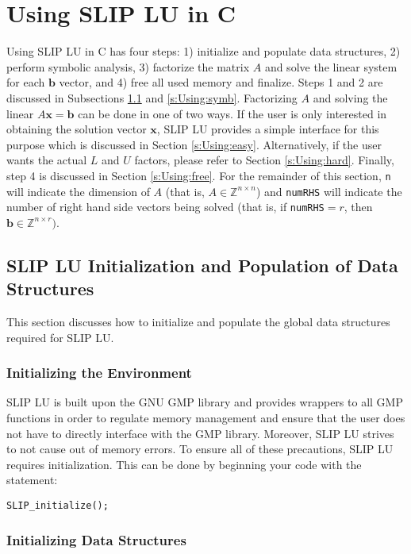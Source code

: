 \documentclass[11pt]{article}
\theoremstyle{definition}
\begin{document}
\cprotect\section{Using SLIP LU in C} \label{s:Using}

Using SLIP LU in C has four steps: 1) initialize and populate data structures, 2) perform symbolic analysis, 3) factorize the matrix $A$ and solve the linear system for each $\mathbf{b}$ vector, and 4) free all used memory and finalize. Steps 1 and 2 are discussed in Subsections \ref{s:Using:init} and \ref{s:Using:symb}. Factorizing $A$ and solving the linear $A \mathbf{x} = \mathbf{b}$ can be done in one of two ways. If the user is only interested in obtaining the solution vector $\mathbf{x}$, SLIP LU provides a simple interface for this purpose which is discussed in Section \ref{s:Using:easy}. Alternatively, if the user wants the actual $L$ and $U$ factors, please refer to Section \ref{s:Using:hard}. Finally, step 4 is discussed in Section \ref{s:Using:free}. For the remainder of this section, \verb|n| will indicate the dimension of $A$ (that is, $A \in \mathbb{Z}^{n \times n}$) and \verb|numRHS| will indicate the number of right hand side vectors being solved (that is, if \verb|numRHS|$= r$, then $\mathbf{b} \in \mathbb{Z}^{n \times r})$.

\cprotect\subsection{SLIP LU Initialization and Population of Data Structures} \label{s:Using:init}

This section discusses how to initialize and populate the global data structures required for SLIP LU.

\subsubsection{Initializing the Environment}

SLIP LU is built upon the GNU GMP library \cite{granlund2015gnu} and provides wrappers to all GMP functions in order to regulate memory management and ensure that the user does not have to directly interface with the GMP library. Moreover, SLIP LU strives to not cause out of memory errors. To ensure all of these precautions, SLIP LU requires initialization. This can be done by beginning your code with the statement:

\verb|SLIP_initialize();|

\subsubsection{Initializing Data Structures}
\end{document}
